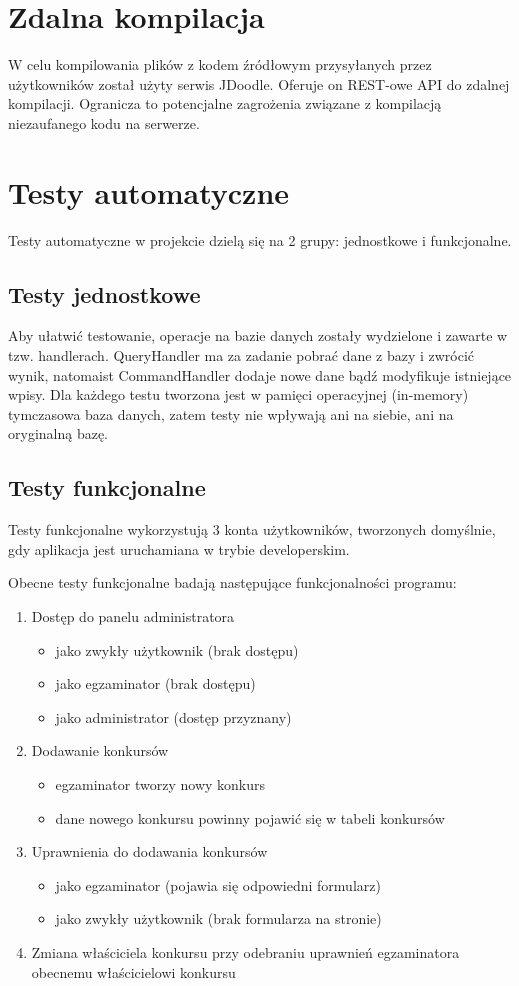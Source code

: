 \documentclass{article}
\begin{document}
\section{Zdalna kompilacja}
W celu kompilowania plików z kodem źródłowym przysyłanych przez użytkowników został użyty serwis JDoodle. Oferuje on REST-owe API do zdalnej kompilacji. Ogranicza to potencjalne zagrożenia związane z kompilacją niezaufanego kodu na serwerze.

\section{Testy automatyczne}
Testy automatyczne w projekcie dzielą się na 2 grupy: jednostkowe i funkcjonalne.
\subsection{Testy jednostkowe}
Aby ułatwić testowanie, operacje na bazie danych zostały wydzielone i zawarte w tzw. handlerach. QueryHandler ma za zadanie pobrać dane z bazy i zwrócić wynik, natomaist CommandHandler dodaje nowe dane bądź modyfikuje istniejące wpisy. Dla każdego testu tworzona jest w pamięci operacyjnej (in-memory) tymczasowa baza danych, zatem testy nie wpływają ani na siebie, ani na oryginalną bazę.
\subsection{Testy funkcjonalne}
Testy funkcjonalne wykorzystują 3 konta użytkowników, tworzonych domyślnie, gdy aplikacja jest uruchamiana w trybie developerskim.

Obecne testy funkcjonalne badają następujące funkcjonalności programu:
\begin{enumerate}
    \item Dostęp do panelu administratora
    \begin{itemize}
        \item jako zwykły użytkownik (brak dostępu)
        \item jako egzaminator (brak dostępu)
        \item jako administrator (dostęp przyznany)
    \end{itemize}
    \item Dodawanie konkursów
    \begin{itemize}
        \item egzaminator tworzy nowy konkurs
        \item dane nowego konkursu powinny pojawić się w tabeli konkursów
    \end{itemize}
    \item Uprawnienia do dodawania konkursów
    \begin{itemize}
        \item jako egzaminator (pojawia się odpowiedni formularz)
        \item jako zwykły użytkownik (brak formularza na stronie)
    \end{itemize}
    \item Zmiana właściciela konkursu przy odebraniu uprawnień egzaminatora obecnemu właścicielowi konkursu
\end{enumerate}
\end{document}
